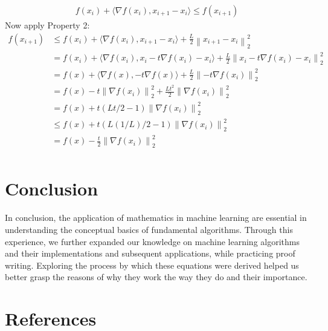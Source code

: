 \documentclass{article}
\newcommand{\norm}[1]{\left\lVert#1\right\rVert}
\begin{document}
\begin{enumerate}
\begin{equation}
    \begin{split}
    f(x_{i}) + 	\langle\nabla f(x_{i}), x_{i+1}-x_{i}\rangle \leq f(x_{i+1}) 
    \end{split}
    \end{equation}
    \newline Now apply Property 2: 
    \begin{equation}
    \begin{split}
    f(x_{i+1}) & \leq  f(x_{i}) + \langle\nabla f(x_{i}), x_{i+1}-x_{i}\rangle + \frac{L}{2}\norm{x_{i+1}-x_{i}}_2^2 \\
    & = f(x_{i}) + \langle\nabla f(x_{i}), x_{i} - t\nabla f(x_{i})-x_{i}\rangle + \frac{L}{2}\norm{x_{i} - t\nabla f(x_{i})-x_{i}}_2^2 \\
    & = f(x) + \langle\nabla f(x), -t\nabla f(x)\rangle + \frac{L}{2}\norm{- t\nabla f(x_{i})}_2^2 \\
    & = f(x) - t\norm{\nabla f(x_{i})}_2^2 +  \frac{Lt^2}{2}\norm{\nabla f(x_{i})}_2^2 \\
    & = f(x) + t(Lt/2 - 1)\norm{\nabla f(x_{i})}_2^2 \\
    & \leq f(x) + t(L(1/L)/2 - 1)\norm{\nabla f(x_{i})}_2^2 \\
    & = f(x) - \frac{t}{2}\norm{\nabla f(x_{i})}_2^2 \\
    \end{split}
    \end{equation}
\end{enumerate}
\section{Conclusion}
In conclusion, the application of mathematics in machine learning are essential in understanding the conceptual basics of fundamental algorithms. Through this experience, we further expanded our knowledge on machine learning algorithms and their implementations and subsequent applications, while practicing proof writing. Exploring the process by which these equations were derived helped us better grasp the reasons of why they work the way they do and their importance. 
\section{References}
\end{document}
